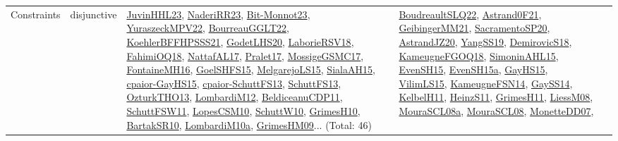 {\begin{longtable}{lp{3cm}>{\raggedright}p{6cm}>{\raggedright}p{6cm}p{8cm}}
Constraints & disjunctive & \href{papers/JuvinHHL23.pdf}{JuvinHHL23}\cite{JuvinHHL23}, \href{articles/NaderiRR23.pdf}{NaderiRR23}\cite{NaderiRR23}, \href{papers/Bit-Monnot23.pdf}{Bit-Monnot23}\cite{Bit-Monnot23}, \href{articles/YuraszeckMPV22.pdf}{YuraszeckMPV22}\cite{YuraszeckMPV22}, \href{articles/BourreauGGLT22.pdf}{BourreauGGLT22}\cite{BourreauGGLT22}, \href{articles/KoehlerBFFHPSSS21.pdf}{KoehlerBFFHPSSS21}\cite{KoehlerBFFHPSSS21}, \href{papers/GodetLHS20.pdf}{GodetLHS20}\cite{GodetLHS20}, \href{articles/LaborieRSV18.pdf}{LaborieRSV18}\cite{LaborieRSV18}, \href{articles/FahimiOQ18.pdf}{FahimiOQ18}\cite{FahimiOQ18}, \href{articles/NattafAL17.pdf}{NattafAL17}\cite{NattafAL17}, \href{papers/Pralet17.pdf}{Pralet17}\cite{Pralet17}, \href{papers/MossigeGSMC17.pdf}{MossigeGSMC17}\cite{MossigeGSMC17}, \href{papers/FontaineMH16.pdf}{FontaineMH16}\cite{FontaineMH16}, \href{articles/GoelSHFS15.pdf}{GoelSHFS15}\cite{GoelSHFS15}, \href{papers/MelgarejoLS15.pdf}{MelgarejoLS15}\cite{MelgarejoLS15}, \href{papers/SialaAH15.pdf}{SialaAH15}\cite{SialaAH15}, \href{papers/cpaior-GayHS15.pdf}{cpaior-GayHS15}\cite{cpaior-GayHS15}, \href{papers/cpaior-SchuttFS13.pdf}{cpaior-SchuttFS13}\cite{cpaior-SchuttFS13}, \href{papers/SchuttFS13.pdf}{SchuttFS13}\cite{SchuttFS13}, \href{articles/OzturkTHO13.pdf}{OzturkTHO13}\cite{OzturkTHO13}, \href{articles/LombardiM12.pdf}{LombardiM12}\cite{LombardiM12}, \href{articles/BeldiceanuCDP11.pdf}{BeldiceanuCDP11}\cite{BeldiceanuCDP11}, \href{articles/SchuttFSW11.pdf}{SchuttFSW11}\cite{SchuttFSW11}, \href{articles/LopesCSM10.pdf}{LopesCSM10}\cite{LopesCSM10}, \href{papers/SchuttW10.pdf}{SchuttW10}\cite{SchuttW10}, \href{papers/GrimesH10.pdf}{GrimesH10}\cite{GrimesH10}, \href{articles/BartakSR10.pdf}{BartakSR10}\cite{BartakSR10}, \href{articles/LombardiM10a.pdf}{LombardiM10a}\cite{LombardiM10a}, \href{papers/GrimesHM09.pdf}{GrimesHM09}\cite{GrimesHM09}... (Total: 46) & \href{papers/BoudreaultSLQ22.pdf}{BoudreaultSLQ22}\cite{BoudreaultSLQ22}, \href{papers/Astrand0F21.pdf}{Astrand0F21}\cite{Astrand0F21}, \href{papers/GeibingerMM21.pdf}{GeibingerMM21}\cite{GeibingerMM21}, \href{articles/SacramentoSP20.pdf}{SacramentoSP20}\cite{SacramentoSP20}, \href{articles/AstrandJZ20.pdf}{AstrandJZ20}\cite{AstrandJZ20}, \href{papers/YangSS19.pdf}{YangSS19}\cite{YangSS19}, \href{papers/DemirovicS18.pdf}{DemirovicS18}\cite{DemirovicS18}, \href{papers/KameugneFGOQ18.pdf}{KameugneFGOQ18}\cite{KameugneFGOQ18}, \href{articles/SimoninAHL15.pdf}{SimoninAHL15}\cite{SimoninAHL15}, \href{papers/EvenSH15.pdf}{EvenSH15}\cite{EvenSH15}, \href{articles/EvenSH15a.pdf}{EvenSH15a}\cite{EvenSH15a}, \href{papers/GayHS15.pdf}{GayHS15}\cite{GayHS15}, \href{papers/VilimLS15.pdf}{VilimLS15}\cite{VilimLS15}, \href{articles/KameugneFSN14.pdf}{KameugneFSN14}\cite{KameugneFSN14}, \href{papers/GaySS14.pdf}{GaySS14}\cite{GaySS14}, \href{articles/KelbelH11.pdf}{KelbelH11}\cite{KelbelH11}, \href{papers/HeinzS11.pdf}{HeinzS11}\cite{HeinzS11}, \href{papers/GrimesH11.pdf}{GrimesH11}\cite{GrimesH11}, \href{articles/LiessM08.pdf}{LiessM08}\cite{LiessM08}, \href{papers/MouraSCL08a.pdf}{MouraSCL08a}\cite{MouraSCL08a}, \href{papers/MouraSCL08.pdf}{MouraSCL08}\cite{MouraSCL08}, \href{papers/MonetteDD07.pdf}{MonetteDD07}\cite{MonetteDD07}, 
\end{longtable}}
